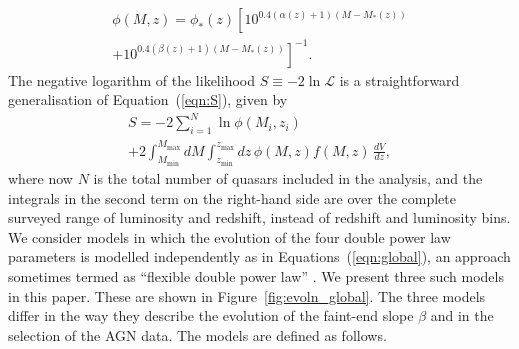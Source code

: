 \documentclass[fleqn,usenatbib]{mnras}
\begin{document}
      \begin{multline}
        \phi(M,z) = \phi_*(z) \left[10^{0.4(\alpha(z)+1)(M-M_*(z))}\right. \\ \left.+ 10^{0.4(\beta(z)+1)(M-M_*(z))}\right]^{-1}.
      \end{multline}
      The negative logarithm of the likelihood $S\equiv -2\ln\mathcal{L}$ is
      a straightforward generalisation of Equation~(\ref{eqn:S}), given by
      \begin{multline}
        S = -2\sum_{i=1}^N\ln\phi(M_i, z_i)\\+2\int_{M_\mathrm{min}}^{M_\mathrm{max}}dM\int_{z_\mathrm{min}}^{z_\mathrm{max}}dz\, \phi(M,z) f(M, z)\,\frac{dV}{dz},
        \label{eqn:S2}
      \end{multline}
      where now $N$ is the total number of quasars included in the analysis,
      and the integrals in the second term on the right-hand side are over
      the complete surveyed range of luminosity and redshift, instead of
      redshift and luminosity bins.  We consider models in which the
      evolution of the four double power law parameters is modelled
      independently as in Equations~(\ref{eqn:global}), an approach
      sometimes termed as ``flexible double power law''
      \citep{2015MNRAS.451.1892A}.  We present three such models in this
      paper.  These are shown in Figure~\ref{fig:evoln_global}.  The three
      models differ in the way they describe the evolution of the faint-end
      slope $\beta$ and in the selection of the AGN data.  The models are
      defined as follows.
\end{document}
